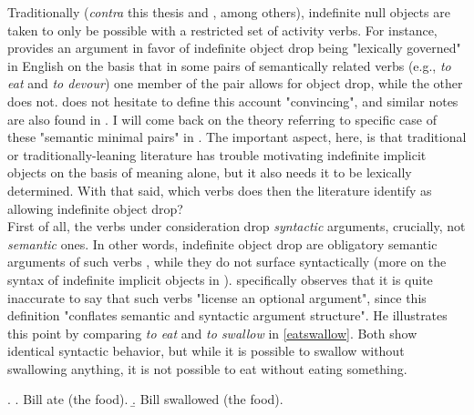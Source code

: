 Traditionally (\textit{contra} this thesis and \textcite[55]{TonelliDelmonte2011}, among others), indefinite null objects are taken to only be possible with a restricted set of activity verbs. For instance, \textcite[510]{Rizzi1986} provides an argument in favor of indefinite object drop being "lexically governed" in English on the basis that in some pairs of semantically related verbs (e.g., \textit{to eat} and \textit{to devour}) one member of the pair allows for object drop, while the other does not. \textcite[236]{Haegeman1987} does not hesitate to define this account "convincing", and similar notes are also found in \textcite{Fillmore1986, Rice1988, Mittwoch2005, Gillon2012}. I will come back on the theory referring to specific case of these "semantic minimal pairs" in . The important aspect, here, is that traditional or traditionally-leaning literature has trouble motivating indefinite implicit objects on the basis of meaning alone, but it also needs it to be lexically determined. With that said, which verbs does then the literature identify as allowing indefinite object drop?\\
First of all, the verbs under consideration drop \textit{syntactic} arguments, crucially, not \textit{semantic} ones. In other words, indefinite object drop are obligatory semantic arguments of such verbs \parencite[120]{Cote1996}, while they do not surface syntactically (more on the syntax of indefinite implicit objects in ). \textcite[134]{Jackendoff2003} specifically observes that it is quite inaccurate to say that such verbs "license an optional argument", since this definition "conflates semantic and syntactic argument structure". He illustrates this point by comparing \textit{to eat} and \textit{to swallow} in \ref{eatswallow}. Both show identical syntactic behavior, but while it is possible to swallow without swallowing anything, it is not possible to eat without eating something.

\ex. \label{eatswallow} \a. \label{eatswallow1} Bill ate (the food).
\b. \label{eatswallow2} Bill swallowed (the food).

